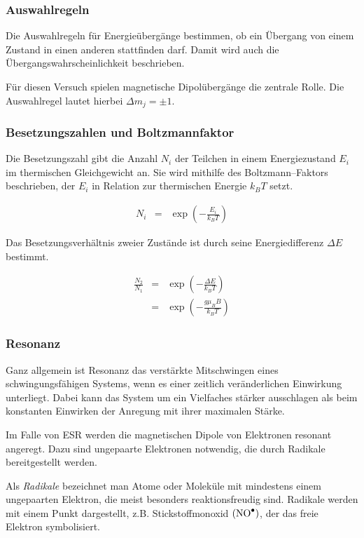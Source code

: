 \documentclass[12pt,a4paper]{scrartcl}
\numberwithin{equation}{section} %
\begin{document}
\subsubsection{Auswahlregeln}
Die Auswahlregeln für Energieübergänge bestimmen, ob ein Übergang von einem Zustand in einen anderen stattfinden darf. Damit wird auch die Übergangswahrscheinlichkeit beschrieben.

Für diesen Versuch spielen magnetische Dipolübergänge die zentrale Rolle. Die Auswahlregel lautet hierbei $\Delta m_j = \pm 1$.

\subsubsection{Besetzungszahlen und Boltzmannfaktor}
Die Besetzungszahl gibt die Anzahl $N_i$ der Teilchen in einem Energiezustand $E_i$ im thermischen Gleichgewicht an. Sie wird mithilfe des Boltzmann--Faktors beschrieben, der $E_i$ in Relation zur thermischen Energie $k_BT$ setzt.

\begin{eqnarray}
	N_i &=& \exp(-\frac{E_i}{k_BT})
\end{eqnarray}

\noindent
Das Besetzungsverhältnis zweier Zustände ist durch seine Energiedifferenz $\Delta E$ bestimmt.

\begin{eqnarray}
	\frac{N_2}{N_1} &=& \exp(-\frac{\Delta E}{k_BT}) \\
		&=& \exp(-\frac{g\mu _B B}{k_BT})
\end{eqnarray}

\hypertarget{resonanz}{\subsubsection{Resonanz}\label{resonanz}}

Ganz allgemein ist Resonanz das verstärkte Mitschwingen eines schwingungsfähigen Systems, wenn es einer zeitlich veränderlichen Einwirkung unterliegt. Dabei kann das System um ein Vielfaches stärker ausschlagen als beim konstanten Einwirken der Anregung mit ihrer maximalen Stärke.

Im Falle von ESR werden die magnetischen Dipole von Elektronen resonant angeregt. Dazu sind ungepaarte Elektronen notwendig, die durch Radikale bereitgestellt werden.

Als \emph{Radikale} bezeichnet man Atome oder Moleküle mit mindestens einem ungepaarten Elektron, die meist besonders reaktionsfreudig sind. Radikale werden mit einem Punkt dargestellt, z.B. Stickstoffmonoxid $(\ce{NO^\bullet})$, der das freie Elektron symbolisiert. \cite{Radikale}
\end{document}
